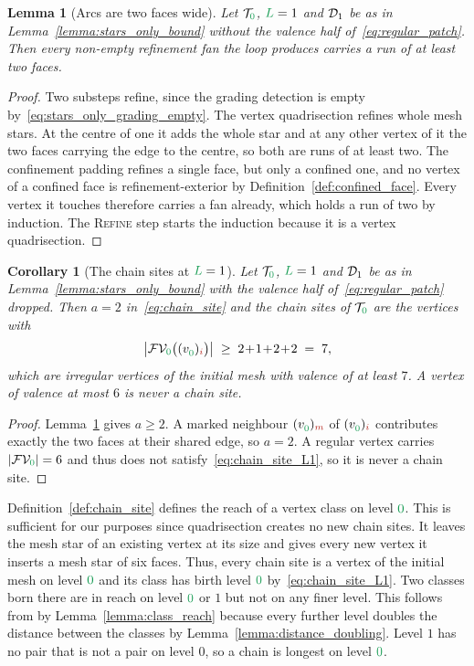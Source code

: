 \documentclass[a4paper, 12pt]{article}
\makeatletter
\newcommand{\green}{\color{ForestGreen}}
\newcommand{\brickred}{\color{BrickRed}}
\newcommand{\T}{\mathcal{T}}
\newcommand{\V}{\mathcal{V}}
\newcommand{\F}{\mathcal{F}}
\newcommand{\vertex}[2]{\freeQ{v}{}{#1}{#2}}
\newcommand{\FVl}[1]{\F\V_{#1}}
\newcommand{\coarseIdxone}{{\brickred i}}
\newcommand{\coarseIdxtwo}{{\brickred m}}
\renewcommand{\L}{{\green L}}
\newcommand{\lzero}{{\green 0}}
\newcommand{\freeQ}[4]{ ( {#1}^{#2}_{#3} )_{#4}}
\newtheorem{lemma}[theorem]{Lemma}
\newtheorem{corollary}[theorem]{Corollary}
\theoremstyle{definition}
\theoremstyle{plain}
\numberwithin{equation}{section}
\DeclareRobustCommand{\domseq}[1][]{\mathcal{D}\ifx\@empty#1\@empty\else_{#1}\fi}
\makeatother
\begin{document}
\begin{lemma}[Arcs are two faces wide]
    \label{lemma:thick_arcs}
    Let $\T_\lzero$, $\L = 1$ and $\domseq[1]$ be as in Lemma~\ref{lemma:stars_only_bound} without the valence half of~\eqref{eq:regular_patch}. Then every non-empty refinement fan the loop produces carries a run of at least two faces.
\end{lemma}
\begin{proof}
    Two substeps refine, since the grading detection is empty by~\eqref{eq:stars_only_grading_empty}. The vertex quadrisection refines whole mesh stars. At the centre of one it adds the whole star and at any other vertex of it the two faces carrying the edge to the centre, so both are runs of at least two. The confinement padding refines a single face, but only a confined one, and no vertex of a confined face is refinement-exterior by Definition~\ref{def:confined_face}. Every vertex it touches therefore carries a fan already, which holds a run of two by induction. The \textsc{Refine} step starts the induction because it is a vertex quadrisection.
\end{proof}

\begin{corollary}[The chain sites at $\L = 1$]
    \label{cor:chain_sites_L1}
    Let $\T_\lzero$, $\L = 1$ and $\domseq[1]$ be as in Lemma~\ref{lemma:stars_only_bound} with the valence half of~\eqref{eq:regular_patch} dropped. Then $a = 2$ in~\eqref{eq:chain_site} and the chain sites of $\T_\lzero$ are the vertices with
    \begin{equation}
        \label{eq:chain_site_L1}
        \big\vert \FVl{\lzero} \big( \vertex{\lzero}{\coarseIdxone} \big) \big\vert \; \geq \; 2 \! + \! 1 \! + \! 2 \! + \! 2 \; = \; 7 ,
    \end{equation}
    which are irregular vertices of the initial mesh with valence of at least $7$. A vertex of valence at most $6$ is never a chain site.
\end{corollary}
\begin{proof}
    Lemma~\ref{lemma:thick_arcs} gives $a \geq 2$. A marked neighbour $\vertex{\lzero}{\coarseIdxtwo}$ of $\vertex{\lzero}{\coarseIdxone}$ contributes exactly the two faces at their shared edge, so $a = 2$. A regular vertex carries $\vert \FVl{\lzero} \vert = 6$ and thus does not satisfy~\eqref{eq:chain_site_L1}, so it is never a chain site.
\end{proof}

Definition~\ref{def:chain_site} defines the reach of a vertex class on level $\lzero$. This is sufficient for our purposes since quadrisection creates no new chain sites. It leaves the mesh star of an existing vertex at its size and gives every new vertex it inserts a mesh star of six faces. Thus, every chain site is a vertex of the initial mesh on level $\lzero$ and its class has birth level $\lzero$ by~\eqref{eq:chain_site_L1}. Two classes born there are in reach on level $\lzero$ or $1$ but not on any finer level. This follows from by Lemma~\ref{lemma:class_reach} because every further level doubles the distance between the classes by Lemma~\ref{lemma:distance_doubling}. Level $1$ has no pair that is not a pair on level $0$, so a chain is longest on level $\lzero$.
\end{document}
